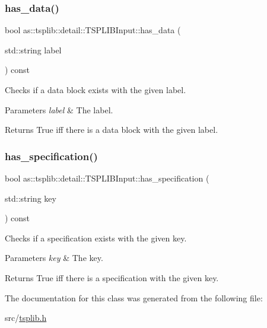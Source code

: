\subsubsection{\texorpdfstring{has\+\_\+data()}{has\_data()}}
{\footnotesize\ttfamily bool as\+::tsplib\+::detail\+::\+T\+S\+P\+L\+I\+B\+Input\+::has\+\_\+data (\begin{DoxyParamCaption}\item[{std\+::string}]{label }\end{DoxyParamCaption}) const\hspace{0.3cm}{\ttfamily [inline]}}



Checks if a data block exists with the given label. 


\begin{DoxyParams}{Parameters}
{\em label} & The label. \\
\hline
\end{DoxyParams}
\begin{DoxyReturn}{Returns}
True iff there is a data block with the given label. 
\end{DoxyReturn}
\mbox{\label{classas_1_1tsplib_1_1detail_1_1TSPLIBInput_ad7fa65c8a6fde860fa52197af814e7de}} 
\subsubsection{\texorpdfstring{has\+\_\+specification()}{has\_specification()}}
{\footnotesize\ttfamily bool as\+::tsplib\+::detail\+::\+T\+S\+P\+L\+I\+B\+Input\+::has\+\_\+specification (\begin{DoxyParamCaption}\item[{std\+::string}]{key }\end{DoxyParamCaption}) const\hspace{0.3cm}{\ttfamily [inline]}}



Checks if a specification exists with the given key. 


\begin{DoxyParams}{Parameters}
{\em key} & The key. \\
\hline
\end{DoxyParams}
\begin{DoxyReturn}{Returns}
True iff there is a specification with the given key. 
\end{DoxyReturn}


The documentation for this class was generated from the following file\+:\begin{DoxyCompactItemize}
\item 
src/\hyperlink{tsplib_8h}{tsplib.\+h}\end{DoxyCompactItemize}
